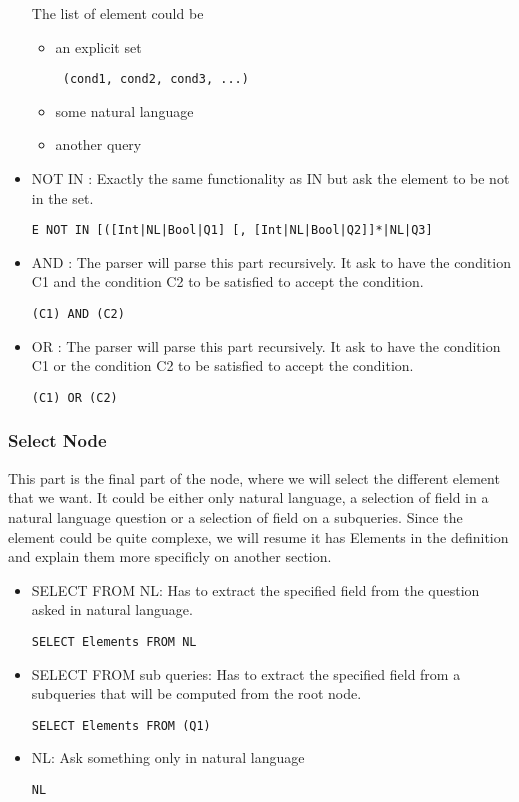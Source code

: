 \documentclass{article}
\begin{document}
\begin{itemize}
\begin{verbatim}
\end{verbatim}
The list of element could be
\begin{itemize}
\item an explicit set
\begin{verbatim}
 (cond1, cond2, cond3, ...)
\end{verbatim}
\item some natural language
\item another query
\end{itemize}
\item NOT IN : Exactly the same functionality as IN but ask the element to be not in the set.
\begin{verbatim}
E NOT IN [([Int|NL|Bool|Q1] [, [Int|NL|Bool|Q2]]*|NL|Q3]
\end{verbatim}
\item AND : The parser will parse this part recursively. It ask to have the condition C1 and the condition C2 to be satisfied to accept the condition.
\begin{verbatim}
(C1) AND (C2)
\end{verbatim}
\item OR : The parser will parse this part recursively. It ask to have the condition C1 or the condition C2 to be satisfied to accept the condition.
\begin{verbatim}
(C1) OR (C2)
\end{verbatim}
\end{itemize}
\subsubsection{Select Node}
This part is the final part of the node, where we will select the different element that we want. It could be either only natural language, a selection of field in a natural language question or a selection of field on a subqueries.
Since the element could be quite complexe, we will resume it has Elements in the definition and explain them more specificly on another section.
\begin{itemize}
\item SELECT FROM NL: Has to extract the specified field from the question asked in natural language.
\begin{verbatim}
SELECT Elements FROM NL
\end{verbatim}
\item SELECT FROM sub queries: Has to extract the specified field from a subqueries that will be computed from the root node.
\begin{verbatim}
SELECT Elements FROM (Q1)
\end{verbatim}
\item NL: Ask something only in natural language
\begin{verbatim}
NL
\end{verbatim}
\end{itemize}
\end{document}
